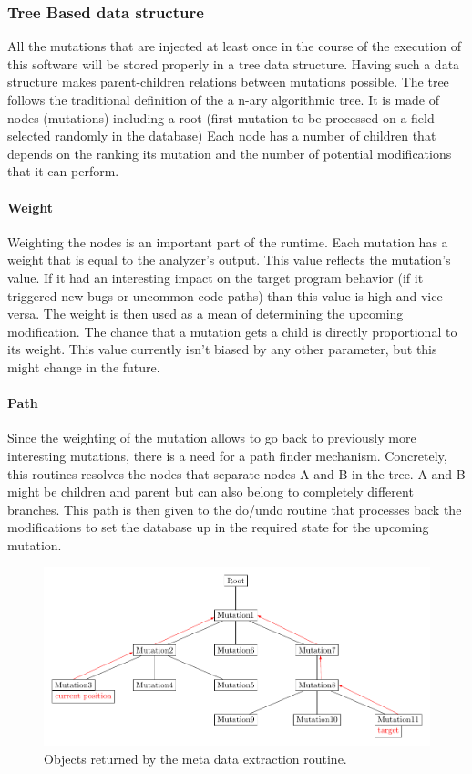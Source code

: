 \documentclass{article}
\begin{document}
\begin{empfile}
			\subsubsection{Tree Based data structure}
All the mutations that are injected at least once in the course of the execution of this software will be stored properly in a tree data structure. Having such a data structure makes parent-children relations between mutations possible. The tree follows the traditional definition of the a n-ary algorithmic tree.
It is made of nodes (mutations) including a root (first mutation to be processed on a field selected randomly in the database)  
Each node has a number of children that depends on the ranking its mutation and the number of potential modifications that it can perform.
				\paragraph{Weight}
Weighting the nodes is an important part of the runtime. Each mutation has a weight that is equal to the analyzer's output. This value reflects the mutation's value. If it had an interesting impact on the target program behavior (if it triggered new bugs or uncommon code paths) than this value is high and vice-versa. The weight is then used as a mean of determining the upcoming modification. The chance that a mutation gets a child is directly proportional to its weight.
This value currently isn't biased by any other parameter, but this might change in the future.  
				\paragraph{Path}
Since the weighting of the mutation allows to go back to previously more interesting mutations, 
there is a need for a path finder mechanism. Concretely, this routines resolves the nodes that separate nodes A and B in the tree. A and B might be children and parent but can also belong to completely different branches. This path is then given to the do/undo routine that processes back the modifications to set the database up in the required state for the upcoming mutation. 

\bigskip

\begin{figure}[h!] 
\centering
\includegraphics[width=\textwidth]{CommonAncestorDiagram.pdf}
\caption{Objects returned by the meta data extraction routine.}
\end{figure}


\end{empfile}
\end{document}
